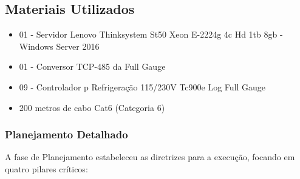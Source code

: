 \documentclass[12pt]{article}
\begin{document}
\subsection{Materiais Utilizados}

\begin{itemize}
    \item 01 - Servidor Lenovo Thinksystem St50 Xeon E-2224g 4c Hd 1tb 8gb - Windows Server 2016
    \item 01 - Conversor TCP-485 da Full Gauge
    \item 09 - Controlador p Refrigeração 115/230V Tc900e Log Full Gauge
    \item 200 metros de cabo Cat6 (Categoria 6)
\end{itemize}

\subsubsection{Planejamento Detalhado}

A fase de Planejamento \cite{pmbok2021} estabeleceu as diretrizes para a execução, focando em quatro pilares críticos:
\end{document}
